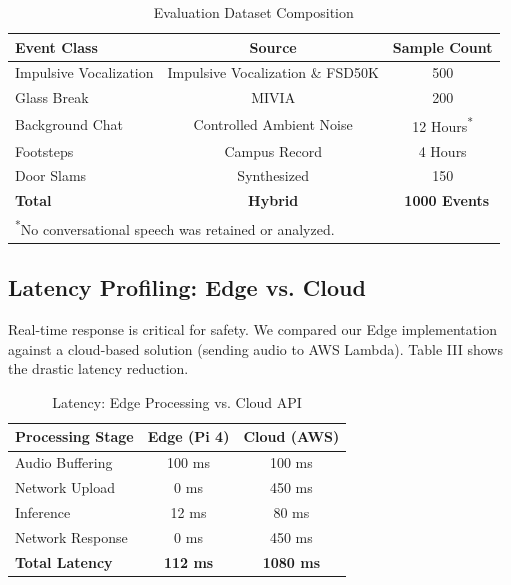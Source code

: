 \documentclass[conference]{IEEEtran}
\begin{document}
\begin{table}[htbp]
\caption{Evaluation Dataset Composition}
\begin{center}
\begin{tabular}{lcc}
\toprule
\textbf{Event Class} & \textbf{Source} & \textbf{Sample Count} \\
\midrule
Impulsive Vocalization & Impulsive Vocalization \& FSD50K \cite{b19} & 500 \\
Glass Break & MIVIA & 200 \\
Background Chat & Controlled Ambient Noise & 12 Hours\textsuperscript{*} \\
Footsteps & Campus Record & 4 Hours \\
Door Slams & Synthesized & 150 \\
\textbf{Total} & \textbf{Hybrid} & \textbf{~1000 Events} \\
\bottomrule
\multicolumn{3}{l}{\textsuperscript{*}\footnotesize No conversational speech was retained or analyzed.}
\end{tabular}
\end{center}
\label{tab:dataset}
\end{table}

\subsection{Latency Profiling: Edge vs. Cloud}
Real-time response is critical for safety. We compared our Edge implementation against a cloud-based solution (sending audio to AWS Lambda). Table III shows the drastic latency reduction.

\begin{table}[htbp]
\caption{Latency: Edge Processing vs. Cloud API}
\begin{center}
\begin{tabular}{lcc}
\toprule
\textbf{Processing Stage} & \textbf{Edge (Pi 4)} & \textbf{Cloud (AWS)} \\
\midrule
Audio Buffering & 100 ms & 100 ms \\
Network Upload & 0 ms & 450 ms \\
Inference & 12 ms & 80 ms \\
Network Response & 0 ms & 450 ms \\
\textbf{Total Latency} & \textbf{112 ms} & \textbf{1080 ms} \\
\bottomrule
\end{tabular}
\end{center}
\label{tab:latency}
\end{table}
\end{document}
